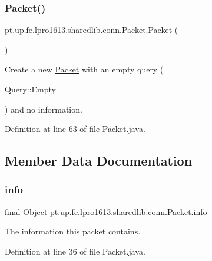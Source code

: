 \subsubsection{\texorpdfstring{Packet()}{Packet()}\hspace{0.1cm}{\footnotesize\ttfamily [3/3]}}
{\footnotesize\ttfamily pt.\+up.\+fe.\+lpro1613.\+sharedlib.\+conn.\+Packet.\+Packet (\begin{DoxyParamCaption}{ }\end{DoxyParamCaption})}

Create a new \hyperlink{classpt_1_1up_1_1fe_1_1lpro1613_1_1sharedlib_1_1conn_1_1_packet}{Packet} with an empty query (
\begin{DoxyCode}
Query::Empty 
\end{DoxyCode}
 ) and no information. 

Definition at line 63 of file Packet.\+java.



\subsection{Member Data Documentation}
\hypertarget{classpt_1_1up_1_1fe_1_1lpro1613_1_1sharedlib_1_1conn_1_1_packet_aa45162e897c5b5a34e4d6c4632cbc096}{}\label{classpt_1_1up_1_1fe_1_1lpro1613_1_1sharedlib_1_1conn_1_1_packet_aa45162e897c5b5a34e4d6c4632cbc096} 
\subsubsection{\texorpdfstring{info}{info}}
{\footnotesize\ttfamily final Object pt.\+up.\+fe.\+lpro1613.\+sharedlib.\+conn.\+Packet.\+info}

The information this packet contains. 

Definition at line 36 of file Packet.\+java.

\hypertarget{classpt_1_1up_1_1fe_1_1lpro1613_1_1sharedlib_1_1conn_1_1_packet_acdc36b134a4d54ae9d3358264584864b}{}\label{classpt_1_1up_1_1fe_1_1lpro1613_1_1sharedlib_1_1conn_1_1_packet_acdc36b134a4d54ae9d3358264584864b} 
